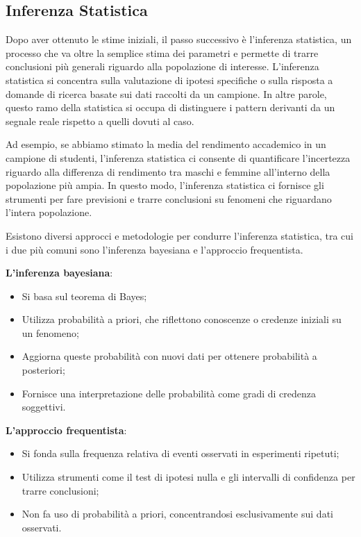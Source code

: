 \documentclass[
  letterpaper,
  krantz2]{{[}./krantz{]}}
\providecommand{\tightlist}{%
  \setlength{\itemsep}{0pt}\setlength{\parskip}{0pt}}\usepackage{longtable,booktabs,array}
\begin{document}
\subsection{Inferenza Statistica}\label{inferenza-statistica}

Dopo aver ottenuto le stime iniziali, il passo successivo è l'inferenza
statistica, un processo che va oltre la semplice stima dei parametri e
permette di trarre conclusioni più generali riguardo alla popolazione di
interesse. L'inferenza statistica si concentra sulla valutazione di
ipotesi specifiche o sulla risposta a domande di ricerca basate sui dati
raccolti da un campione. In altre parole, questo ramo della statistica
si occupa di distinguere i pattern derivanti da un segnale reale
rispetto a quelli dovuti al caso.

Ad esempio, se abbiamo stimato la media del rendimento accademico in un
campione di studenti, l'inferenza statistica ci consente di quantificare
l'incertezza riguardo alla differenza di rendimento tra maschi e femmine
all'interno della popolazione più ampia. In questo modo, l'inferenza
statistica ci fornisce gli strumenti per fare previsioni e trarre
conclusioni su fenomeni che riguardano l'intera popolazione.

Esistono diversi approcci e metodologie per condurre l'inferenza
statistica, tra cui i due più comuni sono l'inferenza bayesiana e
l'approccio frequentista.

\textbf{L'inferenza bayesiana}:

\begin{itemize}
\tightlist
\item
  Si basa sul teorema di Bayes;
\item
  Utilizza probabilità a priori, che riflettono conoscenze o credenze
  iniziali su un fenomeno;
\item
  Aggiorna queste probabilità con nuovi dati per ottenere probabilità a
  posteriori;
\item
  Fornisce una interpretazione delle probabilità come gradi di credenza
  soggettivi.
\end{itemize}

\textbf{L'approccio frequentista}:

\begin{itemize}
\tightlist
\item
  Si fonda sulla frequenza relativa di eventi osservati in esperimenti
  ripetuti;
\item
  Utilizza strumenti come il test di ipotesi nulla e gli intervalli di
  confidenza per trarre conclusioni;
\item
  Non fa uso di probabilità a priori, concentrandosi esclusivamente sui
  dati osservati.
\end{itemize}
\end{document}
